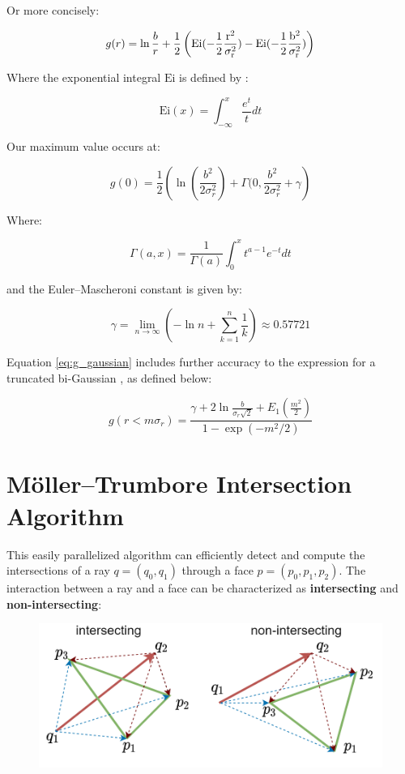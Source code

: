 Or more concisely:

\begin{equation}
    g(r) = \ln\frac{b}{r} + \frac{1}{2}\left(\rm{Ei}(-\frac{1}{2}\frac{r^2}{\sigma_r^2})-\rm{Ei}(-\frac{1}{2}\frac{b^2}{\sigma_r^2})\right)
    \label{eq:g_gaussian}
\end{equation}

Where the exponential integral $\text{Ei}$ is defined by \cite{abramowitz_handbook_2013}: %

$$\text{Ei}(x) = \int_{-\infty}^x \frac{e^t}{t}dt$$

Our maximum value occurs at:

$$g(0) = \frac{1}{2}\left(\ln\left(\frac{b^2}{2\sigma_r^2}\right)+\Gamma(0, \frac{b^2}{2\sigma_r^2}+\gamma\right)$$

Where:

$$\Gamma(a, x) = \frac{1}{\Gamma(a)}\int_0^xt^{a-1}e^{-t}dt$$

and the Euler–Mascheroni constant is given by:

$$\gamma = \lim_{n\to\infty}\left(-\ln n +\sum_{k=1}^n\frac{1}{k}\right) \approx 0.57721$$

Equation \ref{eq:g_gaussian} includes further accuracy to the expression for a truncated bi-Gaussian \cite{ng_physics_2006},\cite{ng_space-charge_2004} as defined below:

$$g(r<m\sigma_r) = \frac{\gamma+2\ln\frac{b}{\sigma_r\sqrt{2}}+E_1(\frac{m^2}{2})}{1-\exp(-m^2/2)}$$

\chapter{Möller–Trumbore Intersection Algorithm}

This easily parallelized algorithm can efficiently detect and compute the intersections of a ray $q=(q_0, q_1)$ through a face $p=(p_0, p_1, p_2)$. The interaction between a ray and a face can be characterized as \textbf{intersecting} and \textbf{non-intersecting}:

\begin{figure}
    \centering
    \includegraphics{figs/moller_trumbore.drawio.png}
\end{figure}

